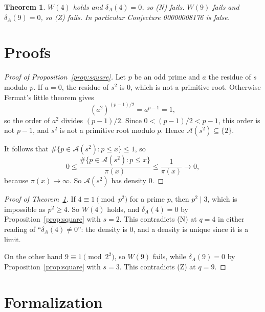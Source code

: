\documentclass[11pt]{article}
\theoremstyle{plain}
\newtheorem{theorem}{Theorem}
\theoremstyle{definition}
\theoremstyle{remark}
\begin{document}
\begin{theorem}\label{thm:main}
$W(4)$ holds and $\delta_A(4)=0$, so (N) fails. $W(9)$ fails and $\delta_A(9)=0$, so
(Z) fails. In particular Conjecture 00000008176 is false.
\end{theorem}

\section{Proofs}

\begin{proof}[Proof of Proposition~\ref{prop:square}]
Let $p$ be an odd prime and $a$ the residue of $s$ modulo $p$. If $a=0$, the residue
of $s^2$ is $0$, which is not a primitive root. Otherwise Fermat's little theorem
gives
\[
(a^2)^{(p-1)/2}=a^{p-1}=1,
\]
so the order of $a^2$ divides $(p-1)/2$. Since $0<(p-1)/2<p-1$, this order is not
$p-1$, and $s^2$ is not a primitive root modulo $p$. Hence $\mathcal A(s^2)
\subseteq\{2\}$.

It follows that $\#\{p\in\mathcal A(s^2):p\le x\}\le1$, so
\[
0\le\frac{\#\{p\in\mathcal A(s^2):p\le x\}}{\pi(x)}\le\frac1{\pi(x)}\to0,
\]
because $\pi(x)\to\infty$. So $\mathcal A(s^2)$ has density $0$.
\end{proof}

\begin{proof}[Proof of Theorem~\ref{thm:main}]
If $4\equiv1\pmod{p^2}$ for a prime $p$, then $p^2\mid3$, which is impossible as
$p^2\ge4$. So $W(4)$ holds, and $\delta_A(4)=0$ by
Proposition~\ref{prop:square} with $s=2$. This contradicts (N) at $q=4$ in either
reading of ``$\delta_A(4)\ne0$'': the density is $0$, and a density is unique since
it is a limit.

On the other hand $9\equiv1\pmod{2^2}$, so $W(9)$ fails, while $\delta_A(9)=0$ by
Proposition~\ref{prop:square} with $s=3$. This contradicts (Z) at $q=9$.
\end{proof}

\section{Formalization}
\sloppy
\end{document}
